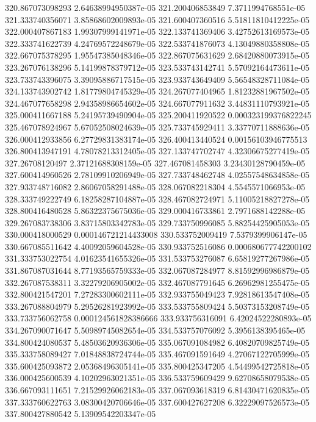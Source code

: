 {320.867073098293 2.64638994950387e-05
321.200406853849 7.3711994768551e-05
321.333740356071 3.85868602009893e-05
321.600407360516 5.51811810412225e-05
322.000407867183 1.99307999141971e-05
322.133741369406 3.42752613169573e-05
322.333741622739 4.24769572248679e-05
322.533741876073 4.13049880358808e-05
322.667075378295 1.95547385048346e-05
322.867075631629 2.68420880073915e-05
323.267076138296 5.14199878379712e-05
323.533743142741 5.57092164473611e-05
323.733743396075 3.39095886717515e-05
323.933743649409 5.56548328711084e-05
324.133743902742 1.81779804745329e-05
324.267077404965 1.81232881967502e-05
324.467077658298 2.94358986654602e-05
324.667077911632 3.44831110793921e-05
325.000411667188 5.24195739490904e-05
325.200411920522 0.000323199376822245
325.467078924967 5.67052508024639e-05
325.733745929411 3.33770711888636e-05
326.000412933856 6.27729831383174e-05
326.400413440524 0.00156103946775513
326.800413947191 4.78078213312405e-05
327.133747702747 4.32306675277419e-05
327.26708120497 2.37121688308159e-05
327.467081458303 3.23430128790459e-05
327.600414960526 2.78109910206949e-05
327.733748462748 4.02557548634858e-05
327.933748716082 2.86067058291488e-05
328.067082218304 4.5545571066953e-05
328.333749222749 6.18258287104887e-05
328.467082724971 5.11005218827278e-05
328.800416480528 5.86322375675036e-05
329.000416733861 2.7971688142288e-05
329.267083738306 3.83715803342783e-05
329.733750996085 5.88254425905053e-05
330.000418000529 0.000146721214433008
330.533752009419 7.5379399906147e-05
330.667085511642 4.40092059604528e-05
330.933752516086 0.000680677742200102
331.333753022754 4.01623541655326e-05
331.533753276087 6.65819277267986e-05
331.867087031644 8.77193565759333e-05
332.067087284977 8.81592996986879e-05
332.267087538311 3.32279206905002e-05
332.467087791645 6.26962981255475e-05
332.800421547201 7.27283300602111e-05
332.933755049423 7.92818613547408e-05
333.267088804979 5.29526281923992e-05
333.533755809424 5.50373153208749e-05
333.733756062758 0.000124561828386666
333.933756316091 6.42024522280893e-05
334.267090071647 5.50989745082654e-05
334.533757076092 5.3956138395465e-05
334.800424080537 5.48503620936306e-05
335.067091084982 6.40820709825749e-05
335.333758089427 7.01848838724744e-05
335.467091591649 4.27067122705999e-05
335.600425093872 2.05368496305141e-05
335.800425347205 4.54499542725818e-05
336.000425600539 4.10202963021351e-05
336.533759609429 9.62708658079538e-05
336.667093111651 7.21529926062183e-05
337.067093618319 6.81430471620835e-05
337.333760622763 3.08300420706646e-05
337.600427627208 6.32229097526573e-05
337.800427880542 5.13909542203347e-05
}
